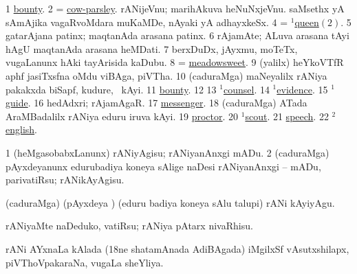 \noindent
\gl{\pagu}
\expl{}
\bmng
\bnum
\num{1}  \hyperref{kandict_b.pdf}{B}{bounty pagu(2)}{bounty}. 
\num{2}  = \hyperref{kandict_c.pdf}{C}{cow-parsley}{cow-parsley}. 
  
\banum
{} rANijeVnu; marihAkuva heNuNxjeVnu. 
 saMsethx yA sAmAjika vagaRvoMdara muKaMDe, nAyaki yA adhayxkeSx. 
\eanum
\numie
\num{4}  = \hyperlink{queen(1)2}{$^1$queen\((2)\)}. 
\num{5}  gatarAjana patinx; maqtanAda arasana patinx. 
\num{6}  rAjamAte; ALuva arasana tAyi hAgU maqtanAda arasana heMDati. 
\num{7}  berxDuDx, jAyxmu, moTeTx, \mo vugaLanunx hAki tayArisida kaDubu. 
\num{8}  = \hyperref{kandict_m.pdf}{M}{meadowsweet}{meadowsweet}. 
\num{9}  (\UK yalilx) heYkoVTfR aphf jasiTxsfna oMdu viBAga, piVTha. 
\num{10}  (caduraMga) maNeyalilx rANiya pakakxda biSapf, kudure, \mo\ kAyi. 
\num{11}  \hyperref{kandict_b.pdf}{B}{bounty pagu(3)}{bounty}. 
\num{12}  
\num{13}  \hyperref{kandict_c.pdf}{C}{counsel(1) pagu(2)}{$^1$counsel}. 
\num{14}  \hyperref{kandict_e.pdf}{E}{evidence(1) nuga}{$^1$evidence}. 
\num{15}  \hyperref{kandict_g.pdf}{G}{guide(1) pagu}{$^1$guide}. 
\num{16}  hedAdxri; rAjamAgaR. 
\num{17}  \hyperref{kandict_m.pdf}{M}{messenger pagu(2)}{messenger}. 
\num{18}  (caduraMga) ATada AraMBadalilx rANiya eduru iruva kAyi. 
\num{19}  \hyperref{kandict_p.pdf}{P}{proctor pagu}{proctor}. 
\num{20}  \hyperref{kandict_s.pdf}{S}{scout(1) pagu}{$^1$scout}. 
\num{21}  \hyperref{kandict_s.pdf}{S}{speech pagu(5)}{speech}. 
\num{22}  \hyperref{kandict_e.pdf}{E}{english(2) pagu(6)}{$^2$english}. 
\enum
\emng
\eentry

\bentry
{} 
\gl{\sakirx}
\expl{}
\bmng
\bnum
\num{1} (heMgasobabxLanunx) rANiyAgisu; rANiyanAnxgi mADu. 
\num{2} (caduraMga) pAyxdeyanunx edurubadiya koneya sAlige naDesi rANiyanAnxgi -- mADu, parivatiRsu; rANikAyAgisu. 
\enum
\emng

\noindent
\gl{\akirx}
\bmng
(caduraMga) (pAyxdeya \vi) (eduru badiya koneya sAlu talupi) rANi kAyiyAgu. 
\emng

\noindent
\gl{\pagu}
\bmng
{} rANiyaMte naDeduko, vatiRsu; rANiya pAtarx nivaRhisu. 
\emng
\eentry

\bentry
{} 
\gl{\gu}
\expl{}
\bmng
rANi AYxnaLa kAlada ({\rm 18}ne shatamAnada AdiBAgada) iMgilxSf vAsutxshilapx, piVThoVpakaraNa, \mo vugaLa sheYliya. 
\emng
\eentry

